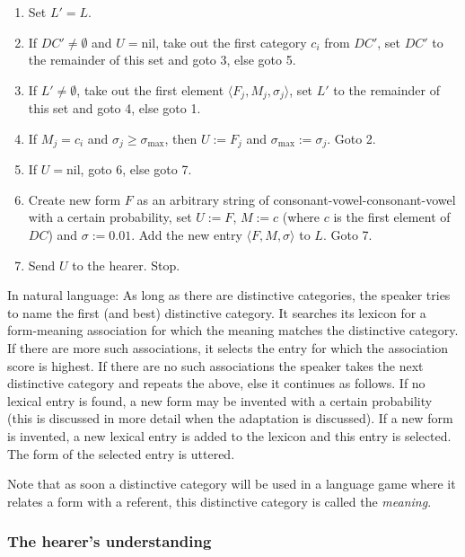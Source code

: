 \begin{enumerate}

\item Set $L'=L$.

\item If $DC' \neq \emptyset$ and $U=\mbox{nil}$, take out the first category $c_i$ from $DC'$, set $DC'$ to the remainder of this set and goto 3, else goto 5.

\item If $L' \neq \emptyset$, take out the first element $\langle F_j,M_j,\sigma_j \rangle$, set $L'$ to the remainder of this set and goto 4, else goto 1.

\item If $M_j = c_i$ and $\sigma_j \geq \sigma_{\mbox{max}}$, then $U:=F_j$ and $\sigma_{\mbox{max}}:=\sigma_j$. Goto 2.

\item If $U = \mbox{nil}$, goto 6, else goto 7.

\item Create new form $F$ as an arbitrary string of consonant-vowel-consonant-vowel with a certain probability, set $U:=F$, $M:=c$ (where $c$ is the first element of $DC$) and $\sigma:=0.01$. Add the new entry $\langle F,M,\sigma \rangle$ to $L$. Goto 7.

\item Send $U$ to the hearer. Stop.

\end{enumerate}
\noindent In natural language: As long as there are distinctive categories, the speaker tries to name the first (and best) distinctive category. It searches its lexicon for a form-meaning association for which the meaning matches the distinctive category. If there are more such associations, it selects the entry for which the association score is highest. If there are no such associations the speaker takes the next distinctive category and repeats the above, else it continues as follows. If no lexical entry is found, a new form may be invented with a certain probability (this is discussed in more detail when the adaptation is discussed). If a new form is invented, a new lexical entry is added to the lexicon and this entry is selected. The form of the selected entry is uttered.

Note that as soon a distinctive category will be used in a language game where it relates a form with a referent, this distinctive category is called the {\em meaning}. 

\subsubsection{The hearer's understanding}\label{s:cm:understanding}

